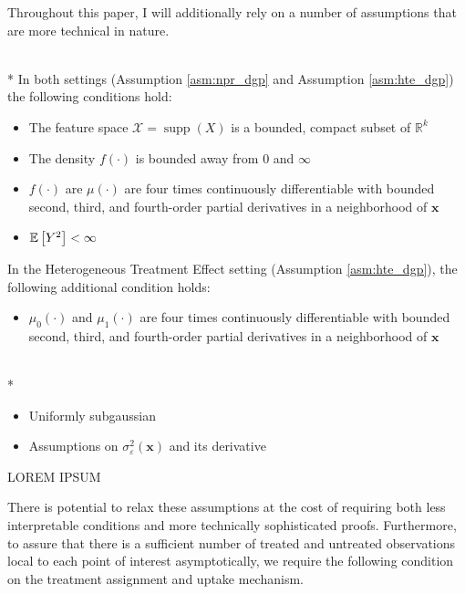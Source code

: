 Throughout this paper, I will additionally rely on a number of assumptions that are more technical in nature.
\begin{boxD}
	\begin{asm}\label{asm:technical}\mbox{}\\*
		In both settings (Assumption \ref{asm:npr_dgp} and Assumption \ref{asm:hte_dgp}) the following conditions hold:
		\begin{itemize}
			\item The feature space $\mathcal{X} = \operatorname{supp}(X)$ is a bounded, compact subset of $\mathbb{R}^k$
			\item The density $f(\cdot)$ is bounded away from 0 and $\infty$
			\item $f(\cdot)$ are $\mu(\cdot)$ are four times continuously differentiable with bounded second, third, and fourth-order partial derivatives in a neighborhood of $\mathbf{x}$
			\item $\mathbb{E}\left[Y^2\right]<\infty$
		\end{itemize}
		In the Heterogeneous Treatment Effect setting (Assumption \ref{asm:hte_dgp}), the following additional condition holds:
		\begin{itemize}
			\item $\mu_0(\cdot)$ and $\mu_1(\cdot)$ are four times continuously differentiable with bounded second, third, and fourth-order partial derivatives in a neighborhood of $\mathbf{x}$
		\end{itemize}
	\end{asm}
\end{boxD}
\begin{boxD}
	\begin{asm}\label{asm:sg_errors}\mbox{}\\*
		\begin{itemize}
			\item Uniformly subgaussian
			\item Assumptions on $\sigma^2_{\varepsilon}\left(\mathbf{x}\right)$ and its derivative
		\end{itemize}
		{\color{red} LOREM IPSUM}
	\end{asm}
\end{boxD}
There is potential to relax these assumptions at the cost of requiring both less interpretable conditions and more technically sophisticated proofs.
Furthermore, to assure that there is a sufficient number of treated and untreated observations local to each point of interest asymptotically, we require the following condition on the treatment assignment and uptake mechanism.

